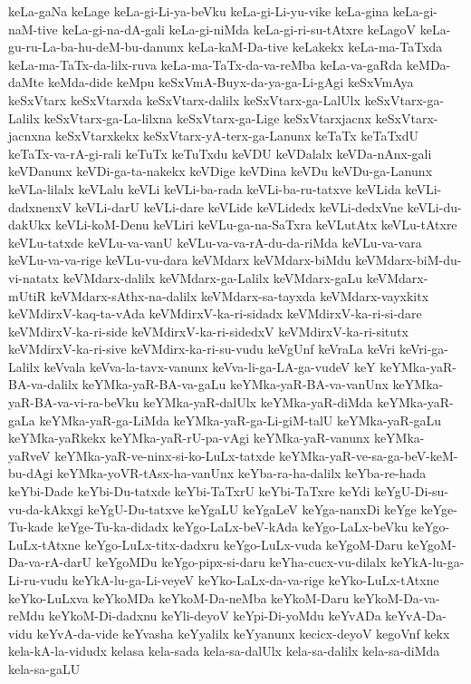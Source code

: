 {keLa-gaNa
keLage
keLa-gi-Li-ya-beVku
keLa-gi-Li-yu-vike
keLa-gina
keLa-gi-naM-tive
keLa-gi-na-dA-gali
keLa-gi-niMda
keLa-gi-ri-su-tAtxre
keLagoV
keLa-gu-ru-La-ba-hu-deM-bu-danunx
keLa-kaM-Da-tive
keLakekx
keLa-ma-TaTxda
keLa-ma-TaTx-da-lilx-ruva
keLa-ma-TaTx-da-va-reMba
keLa-va-gaRda
keMDa-daMte
keMda-dide
keMpu
keSxVmA-Buyx-da-ya-ga-Li-gAgi
keSxVmAya
keSxVtarx
keSxVtarxda
keSxVtarx-dalilx
keSxVtarx-ga-LalUlx
keSxVtarx-ga-Lalilx
keSxVtarx-ga-La-lilxna
keSxVtarx-ga-Lige
keSxVtarxjacnx
keSxVtarx-jacnxna
keSxVtarxkekx
keSxVtarx-yA-terx-ga-Lanunx
keTaTx
keTaTxdU
keTaTx-va-rA-gi-rali
keTuTx
keTuTxdu
keVDU
keVDalalx
keVDa-nAnx-gali
keVDanunx
keVDi-ga-ta-nakekx
keVDige
keVDina
keVDu
keVDu-ga-Lanunx
keVLa-lilalx
keVLalu
keVLi
keVLi-ba-rada
keVLi-ba-ru-tatxve
keVLida
keVLi-dadxnenxV
keVLi-darU
keVLi-dare
keVLide
keVLidedx
keVLi-dedxVne
keVLi-du-dakUkx
keVLi-koM-Denu
keVLiri
keVLu-ga-na-SaTxra
keVLutAtx
keVLu-tAtxre
keVLu-tatxde
keVLu-va-vanU
keVLu-va-va-rA-du-da-riMda
keVLu-va-vara
keVLu-va-va-rige
keVLu-vu-dara
keVMdarx
keVMdarx-biMdu
keVMdarx-biM-du-vi-natatx
keVMdarx-dalilx
keVMdarx-ga-Lalilx
keVMdarx-gaLu
keVMdarx-mUtiR
keVMdarx-sAthx-na-dalilx
keVMdarx-sa-tayxda
keVMdarx-vayxkitx
keVMdirxV-kaq-ta-vAda
keVMdirxV-ka-ri-sidadx
keVMdirxV-ka-ri-si-dare
keVMdirxV-ka-ri-side
keVMdirxV-ka-ri-sidedxV
keVMdirxV-ka-ri-situtx
keVMdirxV-ka-ri-sive
keVMdirx-ka-ri-su-vudu
keVgUnf
keVraLa
keVri
keVri-ga-Lalilx
keVvala
keVva-la-tavx-vanunx
keVva-li-ga-LA-ga-vudeV
keY
keYMka-yaR-BA-va-dalilx
keYMka-yaR-BA-va-gaLu
keYMka-yaR-BA-va-vanUnx
keYMka-yaR-BA-va-vi-ra-beVku
keYMka-yaR-dalUlx
keYMka-yaR-diMda
keYMka-yaR-gaLa
keYMka-yaR-ga-LiMda
keYMka-yaR-ga-Li-giM-talU
keYMka-yaR-gaLu
keYMka-yaRkekx
keYMka-yaR-rU-pa-vAgi
keYMka-yaR-vanunx
keYMka-yaRveV
keYMka-yaR-ve-ninx-si-ko-LuLx-tatxde
keYMka-yaR-ve-sa-ga-beV-keM-bu-dAgi
keYMka-yoVR-tAsx-ha-vanUnx
keYba-ra-ha-dalilx
keYba-re-hada
keYbi-Dade
keYbi-Du-tatxde
keYbi-TaTxrU
keYbi-TaTxre
keYdi
keYgU-Di-su-vu-da-kAkxgi
keYgU-Du-tatxve
keYgaLU
keYgaLeV
keYga-nanxDi
keYge
keYge-Tu-kade
keYge-Tu-ka-didadx
keYgo-LaLx-beV-kAda
keYgo-LaLx-beVku
keYgo-LuLx-tAtxne
keYgo-LuLx-titx-dadxru
keYgo-LuLx-vuda
keYgoM-Daru
keYgoM-Da-va-rA-darU
keYgoMDu
keYgo-pipx-si-daru
keYha-cucx-vu-dilalx
keYkA-lu-ga-Li-ru-vudu
keYkA-lu-ga-Li-veyeV
keYko-LaLx-da-va-rige
keYko-LuLx-tAtxne
keYko-LuLxva
keYkoMDa
keYkoM-Da-neMba
keYkoM-Daru
keYkoM-Da-va-reMdu
keYkoM-Di-dadxnu
keYli-deyoV
keYpi-Di-yoMdu
keYvADa
keYvA-Da-vidu
keYvA-da-vide
keYvasha
keYyalilx
keYyanunx
kecicx-deyoV
kegoVnf
kekx
kela-kA-la-vidudx
kelasa
kela-sada
kela-sa-dalUlx
kela-sa-dalilx
kela-sa-diMda
kela-sa-gaLU
}
